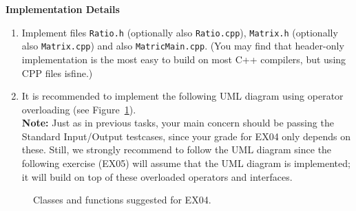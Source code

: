 \documentclass[11pt]{article}
\begin{document}
\vspace{10pt}
{\bf Implementation Details}

\begin{enumerate}
\item Implement files {\tt Ratio.h} (optionally also {\tt Ratio.cpp}), 
{\tt Matrix.h} (optionally also {\tt Matrix.cpp}) and also 
{\tt MatricMain.cpp}.
(You may find that header-only implementation is the most easy to build on most
C++ compilers, but using CPP files isfine.) 
\item It is recommended to implement  
the following UML diagram using operator overloading
(see Figure~\ref{fig:ex04-uml-diagram}).\\
{\bf Note:} Just as in previous tasks, your main concern should be passing the
Standard Input/Output testcases, since your grade for EX04 only depends on these. 
Still, we strongly recommend to follow the UML diagram since 
the following exercise (EX05) will assume that the UML diagram is implemented;
it will build on top of these overloaded operators and interfaces. 
\end{enumerate}

\begin{figure}[!htb]
\caption{\label{fig:ex04-uml-diagram} Classes and functions suggested for EX04.}
\end{figure}
\end{document}
